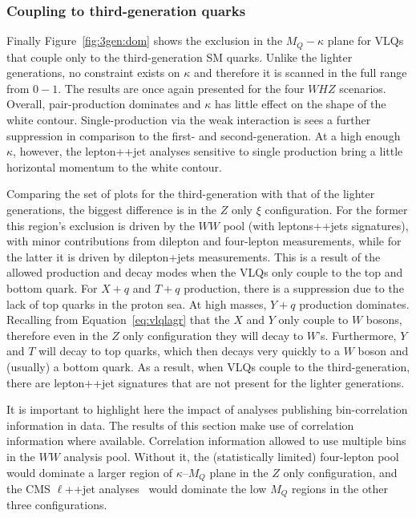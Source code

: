 \subsubsection{Coupling to third-generation quarks}
Finally Figure~\ref{fig:3gen:dom} shows the exclusion in the $M_Q-\kappa$ plane for VLQs that couple only to the third-generation SM quarks. Unlike the lighter generations, no constraint exists on $\kappa$ and therefore it is scanned in the full range from $0-1$. The results are once again presented for the four $WHZ$ scenarios. Overall, pair-production dominates and $\kappa$ has little effect on the shape of the white contour. Single-production via the weak interaction is sees a further suppression in comparison to the first- and second-generation. At a high enough $\kappa$, however, the lepton+\MET{}+jet analyses sensitive to single production bring a little horizontal momentum to the white contour. 

Comparing the set of plots for the third-generation with that of the lighter generations, the biggest difference is in the $Z$ only $\xi$ configuration. For the former this region's exclusion is driven by the \ATLAS $WW$ pool (with leptons+\MET+jets signatures), with minor contributions from dilepton and four-lepton measurements, while for the latter it is driven by dilepton+jets measurements. This is a result of the allowed production and decay modes when the VLQs only couple to the top and bottom quark. For $X+q$ and $T+q$ production, there is a suppression due to the lack of top quarks in the proton sea. At high masses, $Y+q$ production dominates. Recalling from Equation~\ref{eq:vlqlagr} that the $X$ and $Y$ only couple to $W$ bosons, therefore even in the $Z$ only configuration they will decay to $W$'s. Furthermore, $Y$ and $T$ will decay to top quarks, which then decays very quickly to a $W$ boson and (usually) a bottom quark. As a result, when VLQs couple to the third-generation, there are lepton+\MET+jet signatures that are not present for the lighter generations.

It is important to highlight here the impact of analyses publishing bin-correlation information in data. The results of this section make use of correlation information where available. Correlation information allowed \Contur to use multiple bins in the $WW$ analysis pool. Without it, the (statistically limited) \ATLAS four-lepton pool would dominate a larger region of $\kappa$--$M_Q$ plane in the $Z$ only configuration, and the CMS $\ell$+\MET{}+jet analyses~\cite{Aaboud:2018uzf,Aaboud:2017fha,Aaboud:2018eki,Sirunyan:2018wem,Khachatryan:2016mnb,Sirunyan:2018ptc} would dominate the low $M_Q$ regions in the other three configurations.

